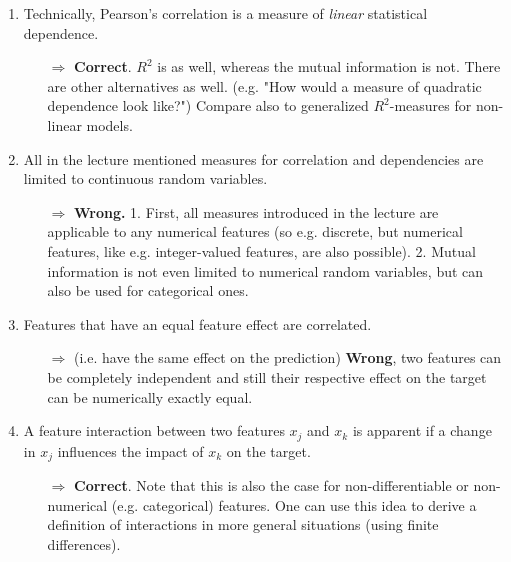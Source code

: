 \begin{enumerate}
        \item Technically, Pearson's correlation is a measure of \textit{linear} statistical dependence. 
        \begin{itemize}
        	\item[$\Rightarrow$] \textbf{Correct}. \(R^2\) is as well, whereas the mutual information is not. There are other alternatives as well. (e.g. "How would a measure of quadratic dependence look like?") Compare also to generalized \(R^2\)-measures for non-linear models.
        \end{itemize}
    	\item All in the lecture mentioned measures for correlation and dependencies are limited to continuous random variables.
    	\begin{itemize}
    		\item[$\Rightarrow$] \textbf{Wrong.} 1. First, all measures introduced in the lecture are applicable to any numerical features (so e.g. discrete, but numerical features, like e.g. integer-valued features, are also possible). 2. Mutual information is not even limited to numerical random variables, but can also be used for categorical ones.
    	\end{itemize}
        \item Features that have an equal feature effect are correlated. 
        \begin{itemize}
        	\item[$\Rightarrow$] (i.e. have the same effect on the prediction) \textbf{Wrong}, two features can be completely independent and still their respective effect on the target can be numerically exactly equal.
        \end{itemize}

    	\item A feature interaction between two features $x_j$ and $x_k$ is apparent if a change in $x_j$ influences the impact of $x_k$ on the target.
    	\begin{itemize}
    		\item[$\Rightarrow$] \textbf{Correct}. Note that this is also the case for non-differentiable or non-numerical (e.g. categorical) features. One can use this idea to derive a definition of interactions in more general situations (using finite differences).
    	\end{itemize}


\end{enumerate}
